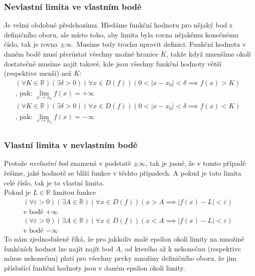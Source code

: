 \documentclass[12pt]{article}
\providecommand{\abs}[1]{\lvert#1\rvert}
\newcommand{\nR}{\mathbb{R}} %
\begin{document}
\subsubsection{Nevlastní limita ve vlastním bodě}
Je velmi obdobné předchozímu. Hledáme funkční hodnotu pro nějaký bod z definičního oboru, ale místo toho, aby limita byla rovna nějakému konečnému číslo, tak je rovna $\pm \infty$. Musíme tedy trochu upravit definici. Funkční hodnota v daném bodě musí přerůstat všechny možné hranice $K$, takže když zmenšíme okolí dostatečně musíme najít takové, kde jsou všechny funkční hodnoty větší (respektive menší) než $K$:
\begin{align}
( \forall K \in \nR) ( \exists \delta >0) ( \forall x \in D(f)) (0 < \abs{x-x_0} < \delta \implies f(x) > K)\\
\text{, pak:	} \lim_{x \to x_0} f(x) = + \infty\\
( \forall K \in \nR) ( \exists \delta >0) ( \forall x \in D(f)) (0 < \abs{x-x_0} < \delta \implies f(x) < K)\\
\text{, pak:	} \lim_{x \to x_0} f(x) = - \infty\\
\end{align}
\subsubsection{Vlastní limita v nevlastním bodě}
Protože \emph{nevlastní bod} znamená v podstatě $\pm \infty$, tak je jasné, že v tomto případě řešíme, jaké hodnotě se blíží funkce v těchto případech. A pokud je tato limita celé číslo, tak je to vlastní limita.\\
Pokud je $L \in \nR$ limitou funkce
\begin{align}
( \forall \varepsilon >0)( \exists A \in \nR) (\forall x \in D(f)) (x>A \implies \abs{f(x)-L} < \varepsilon)\\
\text{v bodě $+ \infty$}\\
( \forall \varepsilon >0)( \exists A \in \nR) (\forall x \in D(f)) (x<A \implies \abs{f(x)-L} < \varepsilon)\\
\text{v bodě $- \infty$}
\end{align}
To nám zjednodušeně říká, že pro jakkoliv malé epsilon okolí limity na množině funkčních hodnot lze najít najít bod $A$, od kterého až k nekonečnu (respektive mínus nekonečnu) platí pro všechny prvky množiny definičního oboru, že jim příslušící funkční hodnoty jsou v daném epsilon okolí limity.
\end{document}
